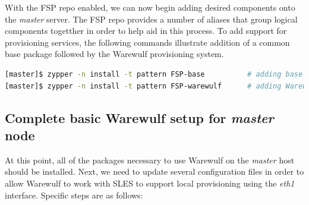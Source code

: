 \documentclass[letterpaper]{article}
\begin{document}
With the FSP repo enabled, we can now begin adding desired components onto the
{\em master} server. The FSP repo provides a number of aliases that group
logical components togetther in order to help aid in this process. To add
support for provisioning services, the following commands illustrate addition
of a common base package followed by the Warewulf provisioning system.

\vspace*{0.2cm}


\begin{lstlisting}[language=bash,keywords={}]
[master]$ zypper -n install -t pattern FSP-base          # adding base FSP packages
[master]$ zypper -n install -t pattern FSP-warewulf      # adding Warewulf support
\end{lstlisting}




\subsection{Complete basic Warewulf setup for {\em master} node}

At this point, all of the packages necessary to use Warewulf on the {\em
  master} host should be installed.  Next, we need to update several
configuration files in order to allow Warewulf to work with SLES to support
local provisioning using the {\em eth1} interface.  Specific steps are as
follows:

\vspace*{0.2cm}

\end{document}
